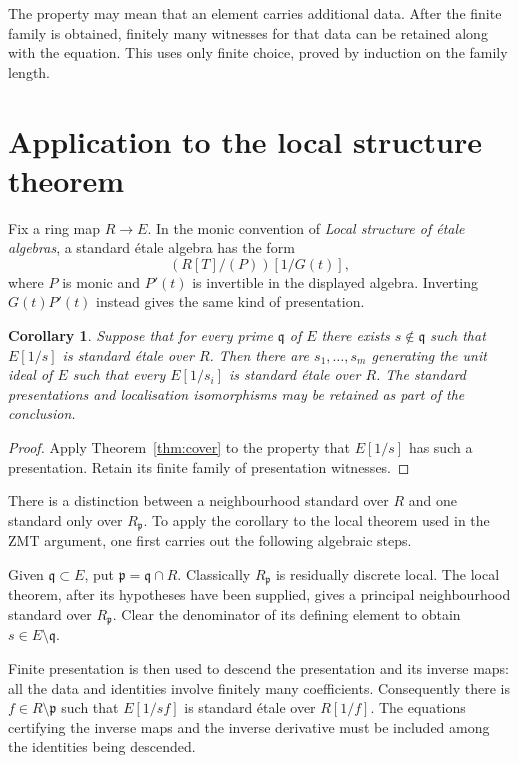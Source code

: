 \documentclass[11pt]{article}
\newtheorem{corollary}[theorem]{Corollary}
\begin{document}
The property may mean that an element carries additional data. After the
finite family is obtained, finitely many witnesses for that data can be
retained along with the equation. This uses only finite choice, proved
by induction on the family length.

\section{Application to the local structure theorem}

Fix a ring map $R\to E$. In the monic convention of
\emph{Local structure of \'etale algebras}, a standard \'etale algebra has
the form
\[
 (R[T]/(P))[1/G(t)],
\]
where $P$ is monic and $P'(t)$ is invertible in the displayed algebra.
Inverting $G(t)P'(t)$ instead gives the same kind of presentation.

\begin{corollary}\label{cor:etale}
Suppose that for every prime $\mathfrak q$ of $E$ there exists
$s\notin\mathfrak q$ such that $E[1/s]$ is standard \'etale over $R$.
Then there are $s_1,\ldots,s_m$ generating the unit ideal of $E$ such
that every $E[1/s_i]$ is standard \'etale over $R$.
The standard presentations and localisation isomorphisms may be
retained as part of the conclusion.
\end{corollary}
\begin{proof}
Apply Theorem~\ref{thm:cover} to the property that $E[1/s]$ has such a
presentation. Retain its finite family of presentation witnesses.
\end{proof}

There is a distinction between a neighbourhood standard over $R$ and
one standard only over $R_{\mathfrak p}$. To apply the corollary to the
local theorem used in the ZMT argument, one first carries out the
following algebraic steps.

Given $\mathfrak q\subset E$, put $\mathfrak p=\mathfrak q\cap R$.
Classically $R_{\mathfrak p}$ is residually discrete local. The local
theorem, after its hypotheses have been supplied, gives a principal
neighbourhood standard over $R_{\mathfrak p}$. Clear the denominator
of its defining element to obtain $s\in E\setminus\mathfrak q$.

Finite presentation is then used to descend the presentation and its
inverse maps: all the data and identities involve finitely many
coefficients. Consequently there is $f\in R\setminus\mathfrak p$ such
that $E[1/sf]$ is standard \'etale over $R[1/f]$.
The equations certifying the inverse maps and the inverse derivative
must be included among the identities being descended.
\end{document}
